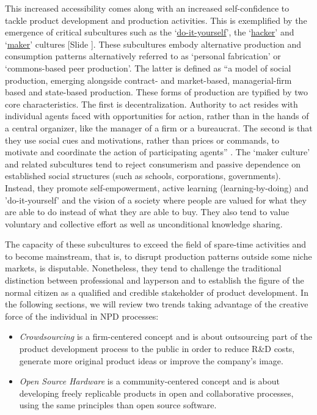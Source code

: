 \documentclass{article}
\newcounter{slide}
\begin{document}
This increased accessibility comes along with an increased self-confidence to tackle product development and production activities. This is exemplified by the emergence of critical subcultures such as the `\href{https://en.wikipedia.org/wiki/DIY_ethic}{do-it-yourself}', the `\href{https://en.wikipedia.org/wiki/Hacker_culture}{hacker}' and `\href{https://en.wikipedia.org/wiki/Maker_culture}{maker}' cultures {\color{blue}[Slide ]}. These subcultures embody alternative production and consumption patterns alternatively referred to as `personal fabrication' \cite{gershenfeldFabComingRevolution2007} or `commons-based peer production'. The latter is defined as ``a model of social production, emerging alongside contract- and market-based, managerial-firm based and state-based production. These forms of production are typified by two core characteristics. The first is decentralization. Authority to act resides with individual agents faced with opportunities for action, rather than in the hands of a central organizer, like the manager of a firm or a bureaucrat. The second is that they use social cues and motivations, rather than prices or commands, to motivate and coordinate the action of participating agents'' \cite{benklerCommonsbasedPeerProduction2006}. The `maker culture' and related subcultures tend to reject consumerism and passive dependence on established social structures (such as schools, corporations, governments). Instead, they promote self-empowerment, active learning (learning-by-doing) and 'do-it-yourself' and the vision of a society where people are valued for what they are able to do instead of what they are able to buy. They also tend to value voluntary and collective effort as well as unconditional knowledge sharing.

The capacity of these subcultures to exceed the field of spare-time activities and to become mainstream, that is, to disrupt production patterns outside some niche markets, is disputable. Nonetheless, they tend to challenge the traditional distinction between professional and layperson and to establish the figure of the normal citizen as a qualified and credible stakeholder of product development. In the following sections, we will review two trends taking advantage of the creative force of the individual in NPD processes:
\begin{itemize}
	\item \emph{Crowdsourcing} is a firm-centered concept and is about outsourcing part of the product development process to the public in order to reduce R\&D costs, generate more original product ideas or improve the company's image. 
	\item \emph{Open Source Hardware} is a community-centered concept and is about developing freely replicable products in open and collaborative processes, using the same principles than open source software. 
\end{itemize}
\end{document}
